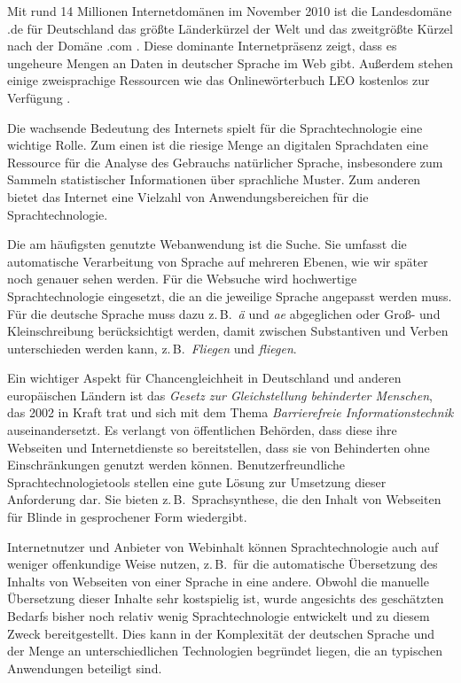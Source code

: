 \documentclass[]{../../metanetpaper}
\begin{document}
\begin{multicols}{2}

Mit rund 14 Millionen Internetdomänen im November 2010 ist die Landesdomäne .de für Deutschland das größte Länderkürzel der Welt und das zweitgrößte Kürzel nach der Domäne .com \cite{denic1,ebrands1}. Diese dominante Internetpräsenz zeigt, dass es ungeheure Mengen an Daten in deutscher Sprache im Web gibt. Außerdem stehen einige zweisprachige Ressourcen wie das Onlinewörterbuch LEO kostenlos zur Verfügung \cite{leo1}.

Die wachsende Bedeutung des Internets spielt für die Sprachtechnologie eine wichtige Rolle. Zum einen ist die riesige Menge an digitalen Sprachdaten eine Ressource für die Analyse des Gebrauchs natürlicher Sprache, insbesondere zum Sammeln statistischer Informationen über sprachliche Muster. Zum anderen bietet das Internet eine Vielzahl von Anwendungsbereichen für die Sprachtechnologie. 


Die am häufigsten genutzte Webanwendung ist die Suche. Sie umfasst die automatische Verarbeitung von Sprache auf mehreren Ebenen, wie wir später noch genauer sehen werden. Für die Websuche wird hochwertige Sprachtechnologie eingesetzt, die an die jeweilige Sprache angepasst werden muss. Für die deutsche Sprache muss dazu z.\,B.~\textit{ä} und \textit{ae} abgeglichen oder Groß- und Kleinschreibung berücksichtigt werden, damit zwischen Substantiven und Verben unterschieden werden kann, z.\,B.~\textit{Fliegen} und \textit{fliegen}. 

Ein wichtiger Aspekt für Chancengleichheit in Deutschland und anderen europäischen Ländern ist das \textit{Gesetz zur Gleichstellung behinderter Menschen}, das 2002 in Kraft trat und sich mit dem Thema \textit{Barrierefreie Informationstechnik} auseinandersetzt. Es verlangt von öffentlichen Behörden, dass diese ihre Webseiten und Internetdienste so bereitstellen, dass sie von Behinderten ohne Einschränkungen genutzt werden können. Benutzerfreundliche Sprachtechnologietools stellen eine gute Lösung zur Umsetzung dieser Anforderung dar. Sie bieten z.\,B.~Sprachsynthese, die den Inhalt von Webseiten für Blinde in gesprochener Form wiedergibt.

Internetnutzer und Anbieter von Webinhalt können Sprachtechnologie auch auf weniger offenkundige Weise nutzen, z.\,B.~für die automatische Übersetzung des Inhalts von Webseiten von einer Sprache in eine andere. Obwohl die manuelle Übersetzung dieser Inhalte sehr kostspielig ist, wurde angesichts des geschätzten Bedarfs bisher noch relativ wenig Sprachtechnologie entwickelt und zu diesem Zweck bereitgestellt. Dies kann in der Komplexität der deutschen Sprache und der Menge an unterschiedlichen Technologien begründet liegen, die an typischen Anwendungen beteiligt sind. 


\end{multicols}
\end{document}
